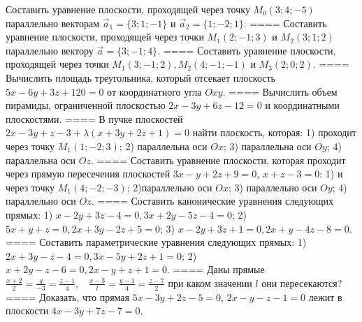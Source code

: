 Составить уравнение плоскости, проходящей через точку \(M_{0}(3;4; - 5)\) параллельно векторам \({\overrightarrow{a}}_{1} = \{ 3;1; - 1\}\) и \({\overrightarrow{a}}_{2} = \{ 1; - 2;1\}\).
====
Составить уравнение плоскости, проходящей через точки \(M_{1}(2; - 1;3)\) и \(M_{2}(3;1;2)\) параллельно вектору \(\overrightarrow{a} = \{ 3; - 1;4\}\).
====
Составить уравнение плоскости, проходящей через точки \(M_{1}(3; - 1;2),M_{2}(4; - 1; - 1)\) и \(M_{3}(2;0;2)\).
====
Вычислить площадь треугольника, который отсекает плоскость \(5x - 6y + 3z + 120 = 0\) от координатного угла \(Oxy\).
====
Вычислить объем пирамиды, ограниченной плоскостью \(2x - 3y + 6z - 12 = 0\) и координатными плоскостями.
====
В пучке плоскостей \(2x - 3y + z - 3 + \lambda(x + 3y + 2z + 1) = 0\) найти плоскость, которая: 1) проходит через точку \(M_{1}(1; - 2;3)\); 2) параллельна оси \(Ox\); 3) параллельна оси \(Oy\); 4) параллельна оси \(Oz\).
====
Составить уравнение плоскости, которая проходит через прямую пересечения плоскостей \(3x - y + 2z + 9 = 0\), \(x + z - 3 = 0\): 1) и через точку \(M_{1}(4; - 2; - 3)\); 2)параллельно оси \(Ox\); 3) параллельно оси \(Oy\); 4) параллельно оси \(Oz\).
====
Составить канонические уравнения следующих прямых: 1) \(x - 2y + 3z - 4 = 0,3x + 2y - 5z - 4 = 0\); 2) \(5x + y + z = 0,2x + 3y - 2z + 5 = 0\); 3) \(x - 2y + 3z + 1 = 0,2x + y - 4z - 8 = 0\).
====
Составить параметрические уравнения следующих прямых: 1) \(2x + 3y - z - 4 = 0,3x - 5y + 2z + 1 = 0\); 2) \(x + 2y - z - 6 = 0,2x - y + z + 1 = 0\).
====
Даны прямые \(\frac{x + 2}{2} = \frac{y}{- 3} = \frac{z - 1}{4},\ \ \ \ \frac{x - 3}{l} = \frac{y - 1}{4} = \frac{z - 7}{2}\) при каком значении \(l\) они пересекаются?
====
Доказать, что прямая \(5x - 3y + 2z - 5 = 0\), \(2x - y - z - 1 = 0\) лежит в плоскости \(4x - 3y + 7z - 7 = 0\).
